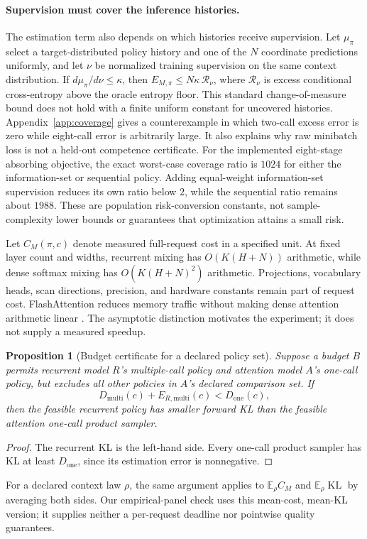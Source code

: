 \documentclass{article}
\newtheorem{proposition}{Proposition}
\newcommand{\KL}{\operatorname{KL}}
\begin{document}
\paragraph{Supervision must cover the inference histories.}
The estimation term also depends on which histories receive supervision.
Let $\mu_\pi$ select a target-distributed policy history and one of the $N$
coordinate predictions uniformly, and let $\nu$ be normalized training
supervision on the same context distribution. If
$d\mu_\pi/d\nu\le\kappa$, then
$E_{M,\pi}\le N\kappa\,\mathcal R_\nu$, where $\mathcal R_\nu$ is excess
conditional cross-entropy above the oracle entropy floor. This standard
change-of-measure bound does not hold with a finite uniform constant for
uncovered histories. Appendix~\ref{app:coverage} gives a counterexample in
which two-call excess error is zero while eight-call error is arbitrarily large.
It also explains why raw minibatch loss is not a held-out competence certificate.
For the implemented eight-stage absorbing objective, the exact worst-case
coverage ratio is $1024$ for either the information-set or sequential policy.
Adding equal-weight information-set supervision reduces its own ratio below
$2$, while the sequential ratio remains about $1988$.
These are population risk-conversion constants, not sample-complexity lower
bounds or guarantees that optimization attains a small risk.


Let $C_M(\pi,c)$ denote measured full-request cost in a specified unit. At fixed
layer count and widths, recurrent mixing has $O(K(H+N))$ arithmetic, while
dense softmax mixing has $O(K(H+N)^2)$ arithmetic. Projections, vocabulary heads,
scan directions, precision, and hardware constants remain part of request
cost. FlashAttention reduces memory traffic without making dense attention
arithmetic linear \citep{flashattention}. The asymptotic distinction motivates
the experiment; it does not supply a measured speedup.

\begin{proposition}[Budget certificate for a declared policy set]
Suppose a budget $B$ permits recurrent model $R$'s multiple-call policy and
attention model $A$'s one-call policy, but excludes all other policies in $A$'s
declared comparison set. If
\begin{equation}
 D_{\mathrm{multi}}(c)+E_{R,\mathrm{multi}}(c)<D_{\mathrm{one}}(c),
 \label{eq:certificate}
\end{equation}
then the feasible recurrent policy has smaller forward KL than the feasible
attention one-call product sampler.
\end{proposition}
\begin{proof}
The recurrent KL is the left-hand side. Every one-call product sampler has KL
at least $D_{\mathrm{one}}$, since its estimation error is nonnegative.
\end{proof}
For a declared context law $\rho$, the same argument applies to
$\mathbb E_\rho C_M$ and $\mathbb E_\rho\KL$ by averaging both sides.
Our empirical-panel check uses this mean-cost, mean-KL version; it supplies
neither a per-request deadline nor pointwise quality guarantees.
\end{document}
